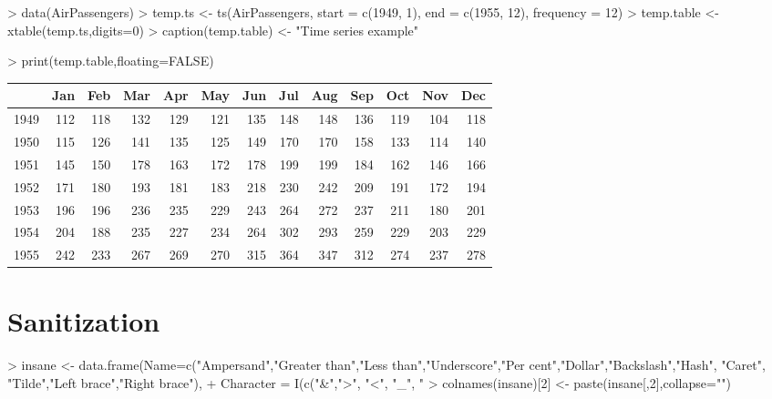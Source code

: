 \documentclass[letterpaper]{article}
\begin{document}
\begin{Schunk}
\begin{Sinput}
> data(AirPassengers)
> temp.ts <- ts(AirPassengers, start = c(1949, 1), end = c(1955, 12), frequency = 12)
> temp.table <- xtable(temp.ts,digits=0)
> caption(temp.table) <- "Time series example"
\end{Sinput}
\end{Schunk}
\begin{Schunk}
\begin{Sinput}
> print(temp.table,floating=FALSE)
\end{Sinput}
% latex table generated in R 3.1.1 by xtable 1.7-3 package
% 
\begin{tabular}{rrrrrrrrrrrrr}
  \hline
 & Jan & Feb & Mar & Apr & May & Jun & Jul & Aug & Sep & Oct & Nov & Dec \\ 
  \hline
1949 & 112 & 118 & 132 & 129 & 121 & 135 & 148 & 148 & 136 & 119 & 104 & 118 \\ 
  1950 & 115 & 126 & 141 & 135 & 125 & 149 & 170 & 170 & 158 & 133 & 114 & 140 \\ 
  1951 & 145 & 150 & 178 & 163 & 172 & 178 & 199 & 199 & 184 & 162 & 146 & 166 \\ 
  1952 & 171 & 180 & 193 & 181 & 183 & 218 & 230 & 242 & 209 & 191 & 172 & 194 \\ 
  1953 & 196 & 196 & 236 & 235 & 229 & 243 & 264 & 272 & 237 & 211 & 180 & 201 \\ 
  1954 & 204 & 188 & 235 & 227 & 234 & 264 & 302 & 293 & 259 & 229 & 203 & 229 \\ 
  1955 & 242 & 233 & 267 & 269 & 270 & 315 & 364 & 347 & 312 & 274 & 237 & 278 \\ 
   \hline
\end{tabular}\end{Schunk}

\section{Sanitization}
\begin{Schunk}
\begin{Sinput}
> insane <- data.frame(Name=c("Ampersand","Greater than","Less than","Underscore","Per cent","Dollar","Backslash","Hash", "Caret", "Tilde","Left brace","Right brace"),
+ 				Character = I(c("&",">",		"<",		"_",		"%",		"$",		"\\", "#",	"^",		"~","{","}")))
> colnames(insane)[2] <- paste(insane[,2],collapse="")
\end{Sinput}
\end{Schunk}
\end{document}
